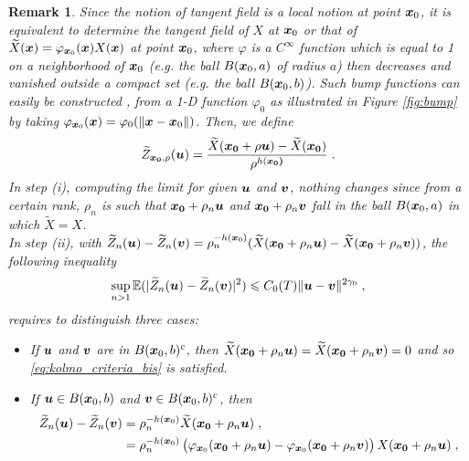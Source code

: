 \documentclass{elsarticle}
\newtheorem{remark}{Remark}
\begin{document}
\begin{remark}\label{rem:kolmo}
Since the notion of tangent field is a local notion at point $\bm{x}_0$, it is equivalent to determine the tangent field of $X$ at $\bm{x}_0$ or that of $\widetilde X(\bm{x})=\varphi_{\bm{x}_0}(\bm{x}) X(\bm{x})$ at point $\bm{x}_0$, where $\varphi$ is a $C^{\infty}$ function which is equal to 1 on a neighborhood of $\bm{x}_0$ (e.g. the ball $B(\bm{x}_0,a)$ of radius $a$) then decreases and vanished outside a compact set (e.g. the ball $B(\bm{x}_0,b)$). Such bump functions can easily be constructed \cite{tu2008bump}, from a 1-D function $\varphi_0$ as illustrated in Figure \ref{fig:bump} by taking $\varphi_{\bm{x}_0}(\bm{x})=\varphi_0( \left\lVert\bm{x}-\bm{x}_0\right\rVert)$. Then, we define
\[
\widetilde Z_{\bm{x_0},\rho}(\bm{u})=\frac{\widetilde X(\bm{x_0}+\rho \bm{u})-\widetilde X(\bm{x_0})}{\rho^{h(\bm{x_0)}}}\;.
\]
In step (i), computing the limit for given $\bm{u}$ and $\bm{v}$, nothing changes since from a certain rank, $\rho_n$ is such that $\bm{x_0}+\rho_n \bm{u}$ and $\bm{x_0}+\rho_n \bm{v}$ fall in the ball $B(\bm{x}_0,a)$ in which $\widetilde X=X$.\\
In step (ii), with $\widetilde Z_n(\bm{u})-\widetilde Z_n(\bm{v})=\rho_n^{-h(\bm{x}_0)}(\widetilde X(\bm{x_0}+\rho_n \bm{u})-\widetilde X(\bm{x_0}+\rho_n \bm{v}))$, the following inequality
\begin{equation}\label{eq:kolmo_criteria_bis}
\sup\limits_{n>1}\mathbb{E}(|\widetilde Z_n(\bm{u})-\widetilde Z_n(\bm{v})|^2)\leqslant C_{0}(T)\lVert \bm{u}-\bm{v}\rVert^{2\gamma_0}\;,
\end{equation}
requires to distinguish three cases:\\
\begin{itemize}
\item If $\bm{u}$ and $\bm{v}$ are in $B(\bm{x}_0,b)^c$, then $\widetilde X(\bm{x_0}+\rho_n \bm{u})=\widetilde X(\bm{x_0}+\rho_n \bm{v})=0$ and so \eqref{eq:kolmo_criteria_bis} is satisfied.
\item If $\bm{u}\in B(\bm{x}_0,b)$ and $\bm{v}\in B(\bm{x}_0,b)^c$, then 
\begin{align*}
\widetilde Z_n(\vect{u})-\widetilde Z_n(\vect{v})
&=\rho_n^{-h(\vect{x}_0)}\widetilde X(\vect{x_0}+\rho_n \vect{u})\;,\\
&=\rho_n^{-h(\vect{x}_0)}\left(\varphi_{\vect{x}_0}(\vect{x_0}+\rho_n \vect{u})-\varphi_{\vect{x}_0}(\vect{x_0}+\rho_n \vect{v})\right)X(\vect{x_0}+\rho_n \vect{u})\;,

\end{align*}
\end{itemize}
\end{remark}
\end{document}
